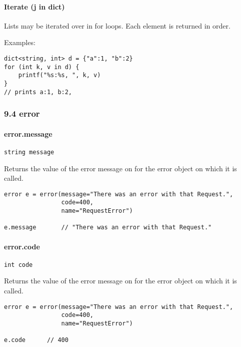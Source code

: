 \paragraph{Iterate (j in dict)}\label{iterate-j-in-dict}

Lists may be iterated over in for loops. Each element is returned in
order.

Examples:

\begin{verbatim}
dict<string, int> d = {"a":1, "b":2}
for (int k, v in d) {
    printf("%s:%s, ", k, v)
}
// prints a:1, b:2,
\end{verbatim}

\subsubsection*{9.4 error}\label{error}

\paragraph{error.message}\label{error.message}

\begin{verbatim}
string message
\end{verbatim}

Returns the value of the error message on for the error object on which
it is called.

\begin{verbatim}
error e = error(message="There was an error with that Request.",
                code=400,
                name="RequestError")

e.message       // "There was an error with that Request."
\end{verbatim}

\paragraph{error.code}\label{error.code}

\begin{verbatim}
int code
\end{verbatim}

Returns the value of the error message on for the error object on which
it is called.

\begin{verbatim}
error e = error(message="There was an error with that Request.",
                code=400,
                name="RequestError")

e.code      // 400
\end{verbatim}

